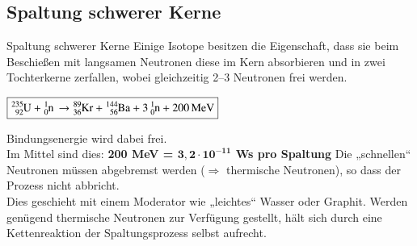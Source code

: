 \subsection{Spaltung schwerer Kerne}

\begin{outline}
    \1 Spaltung schwerer Kerne
    \1 Einige Isotope besitzen die Eigenschaft, dass sie beim Beschießen mit langsamen Neutronen diese im Kern absorbieren und in zwei Tochterkerne zerfallen, wobei gleichzeitig 2–3 Neutronen frei werden.

    \vspace{0.15cm}

    $\boxed{
    \ce{^{235}_{92}U + ^{1}_{0}n \rightarrow  ^{89}_{36}Kr + ^{144}_{56}Ba + 3 ^{1}_{0}n + 200MeV}
    }$

    \vspace{0.15cm}

    \1 Bindungsenergie wird dabei frei.\\
        Im Mittel sind dies: 
        \textbf{200 MeV = $\bm{3{,}2 \cdot 10^{-11}}$ Ws pro Spaltung}
    \1 Die „schnellen“ Neutronen müssen abgebremst werden ($\Rightarrow$  thermische Neutronen), so dass der Prozess nicht abbricht.\\
    Dies geschieht mit einem Moderator wie „leichtes“ Wasser oder Graphit.
    \1 Werden genügend thermische Neutronen zur Verfügung gestellt, hält sich durch eine Kettenreaktion der Spaltungsprozess selbst aufrecht.
\end{outline}






















